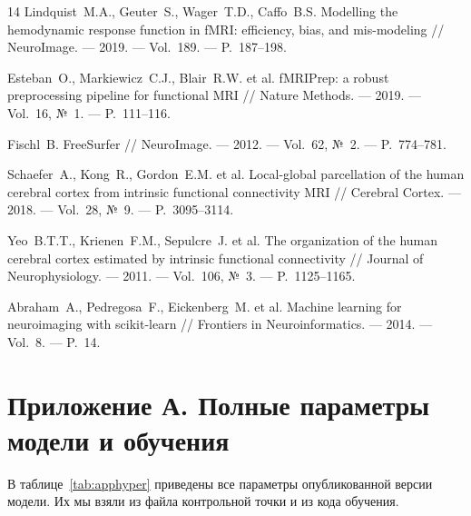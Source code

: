 \documentclass[12pt,a4paper]{article}
\begin{document}
\begin{thebibliography}{14}
 Lindquist~M.A., Geuter~S., Wager~T.D., Caffo~B.S.
Modelling the hemodynamic response function in fMRI: efficiency, bias,
and mis-modeling // NeuroImage. — 2019. — Vol.~189. — P.~187–198.

 Esteban~O., Markiewicz~C.J., Blair~R.W. et al.
fMRIPrep: a robust preprocessing pipeline for functional MRI // Nature
Methods. — 2019. — Vol.~16, №~1. — P.~111–116.

 Fischl~B. FreeSurfer // NeuroImage. — 2012. —
Vol.~62, №~2. — P.~774–781.

 Schaefer~A., Kong~R., Gordon~E.M. et al.
Local-global parcellation of the human cerebral cortex from intrinsic
functional connectivity MRI // Cerebral Cortex. — 2018. — Vol.~28,
№~9. — P.~3095–3114.

 Yeo~B.T.T., Krienen~F.M., Sepulcre~J. et al. The
organization of the human cerebral cortex estimated by intrinsic
functional connectivity // Journal of Neurophysiology. — 2011. —
Vol.~106, №~3. — P.~1125–1165.

 Abraham~A., Pedregosa~F., Eickenberg~M. et al.
Machine learning for neuroimaging with scikit-learn // Frontiers in
Neuroinformatics. — 2014. — Vol.~8. — P.~14.

\end{thebibliography}

\newpage

\section*{Приложение А. Полные параметры модели и обучения}

В таблице~\ref{tab:apphyper} приведены все параметры опубликованной
версии модели. Их мы взяли из файла контрольной точки и из кода
обучения.
\end{document}
